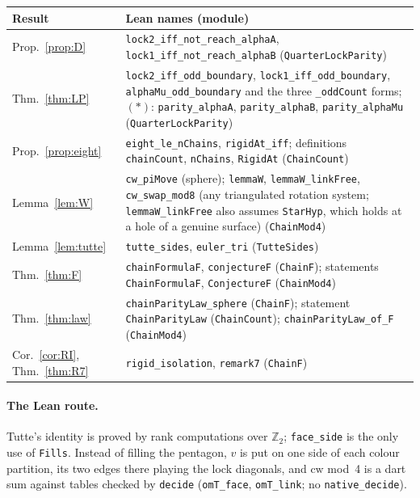 \documentclass[11pt]{article}
\theoremstyle{definition}
\newcommand{\lean}[1]{\texttt{#1}}
\newcommand{\Z}{\mathbb Z}
\newcommand{\cw}{\mathrm{cw}}
\begin{document}
\begin{center}\small
\begin{tabular}{@{}p{2.3cm}p{13.4cm}@{}}
Result & Lean names (module)\\\hline
Prop.~\ref{prop:D} & \lean{lock2\_iff\_not\_reach\_alphaA}, \lean{lock1\_iff\_not\_reach\_alphaB} (\lean{QuarterLockParity})\\
Thm.~\ref{thm:LP} & \lean{lock2\_iff\_odd\_boundary}, \lean{lock1\_iff\_odd\_boundary}, \lean{alphaMu\_odd\_boundary} and the three \lean{\_oddCount} forms; $(\ast)$: \lean{parity\_alphaA}, \lean{parity\_alphaB}, \lean{parity\_alphaMu} (\lean{QuarterLockParity})\\
Prop.~\ref{prop:eight} & \lean{eight\_le\_nChains}, \lean{rigidAt\_iff}; definitions \lean{chainCount}, \lean{nChains}, \lean{RigidAt} (\lean{ChainCount})\\
Lemma~\ref{lem:W} & \lean{cw\_piMove} (sphere); \lean{lemmaW}, \lean{lemmaW\_linkFree}, \lean{cw\_swap\_mod8} (any triangulated rotation system; \lean{lemmaW\_linkFree} also assumes \lean{StarHyp}, which holds at a hole of a genuine surface) (\lean{ChainMod4})\\
Lemma~\ref{lem:tutte} & \lean{tutte\_sides}, \lean{euler\_tri} (\lean{TutteSides})\\
Thm.~\ref{thm:F} & \lean{chainFormulaF}, \lean{conjectureF} (\lean{ChainF}); statements \lean{ChainFormulaF}, \lean{ConjectureF} (\lean{ChainMod4})\\
Thm.~\ref{thm:law} & \lean{chainParityLaw\_sphere} (\lean{ChainF}); statement \lean{ChainParityLaw} (\lean{ChainCount}); \lean{chainParityLaw\_of\_F} (\lean{ChainMod4})\\
Cor.~\ref{cor:RI}, Thm.~\ref{thm:R7} & \lean{rigid\_isolation}, \lean{remark7} (\lean{ChainF})\\
\end{tabular}
\end{center}

\paragraph{The Lean route.} Tutte's identity is proved by rank computations over $\Z_2$; \lean{face\_side} is the only use of \lean{Fills}. Instead of filling the pentagon, $v$ is put on one side of each colour partition, its two edges there playing the lock diagonals, and $\cw$ mod~4 is a dart sum against tables checked by \lean{decide} (\lean{omT\_face}, \lean{omT\_link}; no \texttt{native\_decide}).
\end{document}
